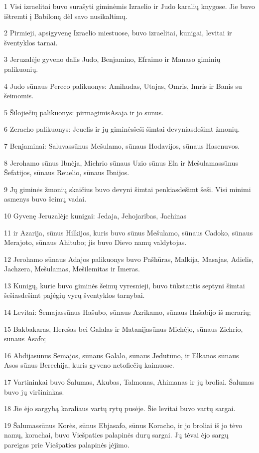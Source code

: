 \par 1 Visi izraelitai buvo surašyti giminėmis Izraelio ir Judo karalių knygose. Jie buvo ištremti į Babiloną dėl savo nusikaltimų. 
\par 2 Pirmieji, apsigyvenę Izraelio miestuose, buvo izraelitai, kunigai, levitai ir šventyklos tarnai. 
\par 3 Jeruzalėje gyveno dalis Judo, Benjamino, Efraimo ir Manaso giminių palikuonių. 
\par 4 Judo sūnaus Pereco palikuonys: Amihudas, Utajas, Omris, Imris ir Banis su šeimomis. 
\par 5 Šilojiečių palikuonys: pirmagimis­Asaja ir jo sūnūs. 
\par 6 Zeracho palikuonys: Jeuelis ir jų giminės­šeši šimtai devyniasdešimt žmonių. 
\par 7 Benjaminai: Saluvas­sūnus Mešulamo, sūnaus Hodavijos, sūnaus Hasenuvos. 
\par 8 Jerohamo sūnus Ibnėja, Michrio sūnaus Uzio sūnus Ela ir Mešulamas­sūnus Šefatijos, sūnaus Reuelio, sūnaus Ibnijos. 
\par 9 Jų giminės žmonių skaičius buvo devyni šimtai penkiasdešimt šeši. Visi minimi asmenys buvo šeimų vadai. 
\par 10 Gyvenę Jeruzalėje kunigai: Jedaja, Jehojaribas, Jachinas 
\par 11 ir Azarija, sūnus Hilkijos, kuris buvo sūnus Mešulamo, sūnaus Cadoko, sūnaus Merajoto, sūnaus Ahitubo; jis buvo Dievo namų valdytojas. 
\par 12 Jerohamo sūnaus Adajos palikuonys buvo Pašhūras, Malkija, Masajas, Adielis, Jachzera, Mešulamas, Mešilemitas ir Imeras. 
\par 13 Kunigų, kurie buvo giminės šeimų vyresnieji, buvo tūkstantis septyni šimtai šešiasdešimt pajėgių vyrų šventyklos tarnybai. 
\par 14 Levitai: Šemajas­sūnus Hašubo, sūnaus Azrikamo, sūnaus Hašabijo iš merarių; 
\par 15 Bakbakaras, Herešas bei Galalas ir Matanija­sūnus Michėjo, sūnaus Zichrio, sūnaus Asafo; 
\par 16 Abdija­sūnus Semajos, sūnaus Galalo, sūnaus Jedutūno, ir Elkanos sūnaus Asos sūnus Berechija, kuris gyveno netofiečių kaimuose. 
\par 17 Vartininkai buvo Šalumas, Akubas, Talmonas, Ahimanas ir jų broliai. Šalumas buvo jų viršininkas. 
\par 18 Jie ėjo sargybą karaliaus vartų rytų pusėje. Šie levitai buvo vartų sargai. 
\par 19 Šalumas­sūnus Korės, sūnus Ebjasafo, sūnus Koracho, ir jo broliai iš jo tėvo namų, korachai, buvo Viešpaties palapinės durų sargai. Jų tėvai ėjo sargų pareigas prie Viešpaties palapinės įėjimo. 

